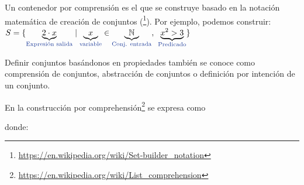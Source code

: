 Un contenedor por comprensión es el que se construye basado en la notación matemática de creación de conjuntos (\footnote{\url{https://en.wikipedia.org/wiki/Set-builder_notation}}).  
Por ejemplo, podemos construir:
$\displaystyle S=\{\underbrace {2\cdot x} _{\color {DarkBlue}{\text{Expresión salida}}}\mid \underbrace {x} _{\color {DarkBlue}{\text{variable}}}\in \underbrace {\mathbb {N} } _{\color {DarkBlue}{\text{Conj. entrada}}},\ \underbrace {x^{2}>3} _{\color {DarkBlue}{\text{Predicado}}}\}
$

Definir conjuntos basándonos en propiedades también se conoce como comprensión de conjuntos, abstracción de conjuntos o definición por intención de un conjunto.


\noindent En  la construcción por comprehensión\footnote{\url{https://en.wikipedia.org/wiki/List_comprehension}} se expresa como 

\centerline{ }

\noindent donde:

